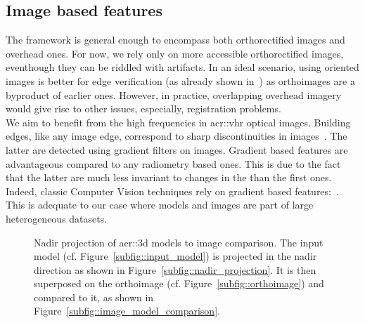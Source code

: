    \subsection{Image based features}
        \label{subsec::learned_evaluation::baseline::image}
        The framework is general enough to encompass both orthorectified images and overhead ones.
        For now, we rely only on more accessible orthorectified images, eventhough they can be riddled with artifacts.
        In an ideal scenario, using oriented images is better for edge verification (as already shown in~\parencite{michelin2013quality}) as orthoimages are a byproduct of earlier ones.
        However, in practice, overlapping overhead imagery would give rise to other issues, especially, registration problems.\\

        We aim to benefit from the high frequencies in \gls{acr::vhr} optical images.
        Building edges, like any image edge, correspond to sharp discontinuities in images~\parencite{ortner2007building}.
        The latter are detected using gradient filters on images.
        Gradient based features are advantageous compared to any radiometry based ones.
        This is due to the fact that the latter are much less invariant to changes in the than the first ones.
        Indeed, classic Computer Vision techniques rely on gradient based features:~\parencite{lowe2004distinctive,dalal2005histograms}.
        This is adequate to our case where models and images are part of large heterogeneous datasets.\\

        \begin{figure}[htb]
            \centering
            
            \caption{
                \label{fig::nadir_projection}
                Nadir projection of \gls{acr::3d} models to image comparison.
                The input model (cf. Figure~\ref{subfig::input_model}) is projected in the nadir direction as shown in Figure~\ref{subfig::nadir_projection}.
                It is then superposed on the orthoimage (cf. Figure~\ref{subfig::orthoimage}) and compared to it, as shown in Figure~\ref{subfig::image_model_comparison}.
            }
        \end{figure}
        
